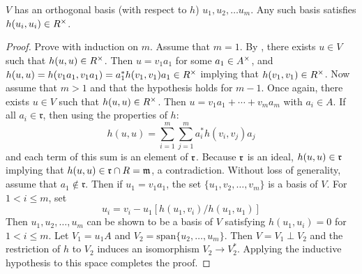 \begin{lemma}\label{lemma2.2}
$V$ has an orthogonal basis (with respect to $h$) $u_1, u_2, \dotsc u_m$.
Any such basis satisfies $h(u_i, u_i) \in R^\times$.
\end{lemma}
\begin{proof}
Prove with induction on $m$.
Assume that $m = 1$.
By , there exists $u \in V$ such that $h(u,u) \in R^\times$.
Then $u = v_1a_1$ for some $a_1 \in A^\times$, and $h(u,u) = h(v_1a_1, v_1a_1) = a_1^*h(v_1,v_1)a_1 \in R^\times$ implying that $h(v_1, v_1) \in R^\times$.
Now assume that $m > 1$ and that the hypothesis holds for $m - 1$.
Once again, there exists $u \in V$ such that $h(u,u) \in R^\times$.
Then $u = v_1a_1 + \dotsb + v_m a_m$ with $a_i \in A$.
If all $a_i \in \mathfrak{r}$, then using the properties of $h$:
\[
h(u,u) = \sum_{i=1}^m \sum_{j=1}^m a_i^* h(v_i, v_j) a_j
\]
and each term of this sum is an element of $\mathfrak{r}$.
Because $\mathfrak{r}$ is an ideal, $h(u,u) \in \mathfrak{r}$ implying that $h(u,u) \in \mathfrak{r} \cap R = \mathfrak{m}$, a contradiction.
Without loss of generality, assume that $a_1 \not\in \mathfrak{r}$.
Then if $u_1 = v_1 a_1$, the set $\{u_1, v_2, \dotsc, v_m\}$ is a basis of $V$.
For $1 < i \le m$, set
\[
u_i = v_i - u_1[h(u_1,v_i)/h(u_1, u_1)]
\]
Then $u_1, u_2, \dotsc, u_m$ can be shown to be a basis of $V$ satisfying $h(u_1, u_i) = 0$ for $1 < i \le m$.
Let $V_1 = u_1 A$ and $V_2 = \text{span} \{u_2, \dotsc, u_m\}$.
Then $V = V_1 \perp V_2$ and the restriction of $h$ to $V_2$ induces an isomorphism $V_2 \to V_2^*$.
Applying the inductive hypothesis to this space completes the proof.
\end{proof}

